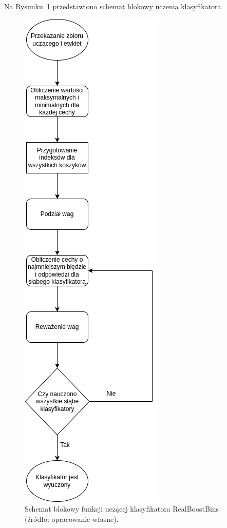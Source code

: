 Na Rysunku~\ref{fig:fit_realboostbins} przedstawiono schemat blokowy uczenia klasyfikatora.
\begin{figure}[!ht]
    \centering
    \includegraphics[scale=0.4]{Pictures/fit_realboostbins}
    \caption{Schemat blokowy funkcji uczącej klasyfikatora RealBoostBins (źródło: opracowanie własne).}
    \label{fig:fit_realboostbins}
\end{figure}
\FloatBarrier


